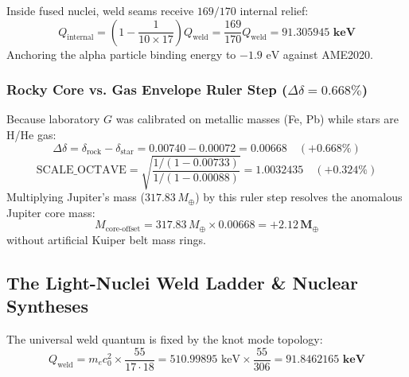 \documentclass[11pt,a4paper]{article}
\begin{document}
Inside fused nuclei, weld seams receive $169/170$ internal relief:
\begin{equation}
Q_{\text{internal}} = \left(1 - \frac{1}{10 \times 17}\right) Q_{\text{weld}} = \frac{169}{170} Q_{\text{weld}} = \mathbf{91.305945\text{ keV}}
\end{equation}
Anchoring the alpha particle binding energy to $-1.9\text{ eV}$ against AME2020.

\subsubsection{Rocky Core vs. Gas Envelope Ruler Step ($\Delta\delta = 0.668\%$)}
\label{subsubsec:ruler_step}

Because laboratory $G$ was calibrated on metallic masses (Fe, Pb) while stars are H/He gas:
\begin{equation}
\Delta \delta = \delta_{\text{rock}} - \delta_{\text{star}} = 0.00740 - 0.00072 = \mathbf{0.00668} \quad (\mathbf{+0.668\%})
\end{equation}
\begin{equation}
\boxed{\text{SCALE\_OCTAVE} = \sqrt{\frac{1 / (1 - 0.00733)}{1 / (1 - 0.00088)}} = \mathbf{1.0032435} \quad (\mathbf{+0.324\%})}
\end{equation}
Multiplying Jupiter's mass ($317.83\,M_\oplus$) by this ruler step resolves the anomalous Jupiter core mass:
\begin{equation}
M_{\text{core-offset}} = 317.83\,M_\oplus \times 0.00668 = \mathbf{+2.12\,M_\oplus}
\end{equation}
without artificial Kuiper belt mass rings.

\subsection{The Light-Nuclei Weld Ladder \& Nuclear Syntheses}
\label{subsec:weld_ladder}

The universal weld quantum is fixed by the knot mode topology:
\begin{equation}
\boxed{Q_{\text{weld}} = m_e c_0^2 \times \frac{55}{17 \cdot 18} = 510.99895\text{ keV} \times \frac{55}{306} = \mathbf{91.8462165\text{ keV}}}
\end{equation}
\end{document}
